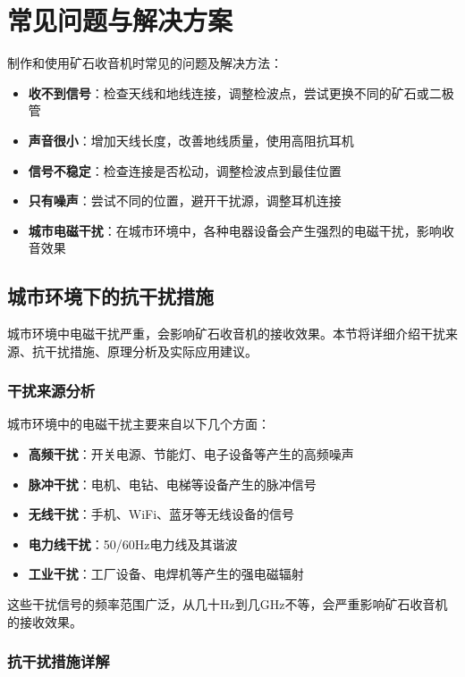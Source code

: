 \documentclass[12pt,UTF8]{ctexbook}
\begin{document}
\section{常见问题与解决方案}

制作和使用矿石收音机时常见的问题及解决方法：
\begin{itemize}[leftmargin=3.5em]
    \item \textbf{收不到信号}：检查天线和地线连接，调整检波点，尝试更换不同的矿石或二极管
    \item \textbf{声音很小}：增加天线长度，改善地线质量，使用高阻抗耳机
    \item \textbf{信号不稳定}：检查连接是否松动，调整检波点到最佳位置
    \item \textbf{只有噪声}：尝试不同的位置，避开干扰源，调整耳机连接
    \item \textbf{城市电磁干扰}：在城市环境中，各种电器设备会产生强烈的电磁干扰，影响收音效果
\end{itemize}

\subsection{城市环境下的抗干扰措施}

城市环境中电磁干扰严重，会影响矿石收音机的接收效果。本节将详细介绍干扰来源、抗干扰措施、原理分析及实际应用建议。

\subsubsection{干扰来源分析}

城市环境中的电磁干扰主要来自以下几个方面：

\begin{itemize}
  \item \textbf{高频干扰}：开关电源、节能灯、电子设备等产生的高频噪声
  \item \textbf{脉冲干扰}：电机、电钻、电梯等设备产生的脉冲信号
  \item \textbf{无线干扰}：手机、WiFi、蓝牙等无线设备的信号
  \item \textbf{电力线干扰}：50/60Hz电力线及其谐波
  \item \textbf{工业干扰}：工厂设备、电焊机等产生的强电磁辐射
\end{itemize}

这些干扰信号的频率范围广泛，从几十Hz到几GHz不等，会严重影响矿石收音机的接收效果。

\subsubsection{抗干扰措施详解}
\end{document}
